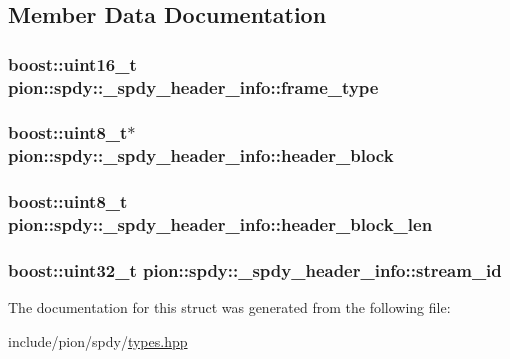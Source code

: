 \subsection{Member Data Documentation}
\hypertarget{structpion_1_1spdy_1_1__spdy__header__info_afa1a89722edd7a2eda6fd7a15abf7e76}{
\subsubsection[{frame\-\_\-type}]{\setlength{\rightskip}{0pt plus 5cm}boost\-::uint16\-\_\-t pion\-::spdy\-::\-\_\-spdy\-\_\-header\-\_\-info\-::frame\-\_\-type}}\label{structpion_1_1spdy_1_1__spdy__header__info_afa1a89722edd7a2eda6fd7a15abf7e76}
\hypertarget{structpion_1_1spdy_1_1__spdy__header__info_a04e2da993193a952036d13477114bd0e}{
\subsubsection[{header\-\_\-block}]{\setlength{\rightskip}{0pt plus 5cm}boost\-::uint8\-\_\-t$\ast$ pion\-::spdy\-::\-\_\-spdy\-\_\-header\-\_\-info\-::header\-\_\-block}}\label{structpion_1_1spdy_1_1__spdy__header__info_a04e2da993193a952036d13477114bd0e}
\hypertarget{structpion_1_1spdy_1_1__spdy__header__info_a0b5e5f60e357c45af5069d8c7e270028}{
\subsubsection[{header\-\_\-block\-\_\-len}]{\setlength{\rightskip}{0pt plus 5cm}boost\-::uint8\-\_\-t pion\-::spdy\-::\-\_\-spdy\-\_\-header\-\_\-info\-::header\-\_\-block\-\_\-len}}\label{structpion_1_1spdy_1_1__spdy__header__info_a0b5e5f60e357c45af5069d8c7e270028}
\hypertarget{structpion_1_1spdy_1_1__spdy__header__info_a34f64295be06d0aabaf70142f78e3050}{
\subsubsection[{stream\-\_\-id}]{\setlength{\rightskip}{0pt plus 5cm}boost\-::uint32\-\_\-t pion\-::spdy\-::\-\_\-spdy\-\_\-header\-\_\-info\-::stream\-\_\-id}}\label{structpion_1_1spdy_1_1__spdy__header__info_a34f64295be06d0aabaf70142f78e3050}


The documentation for this struct was generated from the following file\-:\begin{DoxyCompactItemize}
\item 
include/pion/spdy/\hyperlink{spdy_2types_8hpp}{types.\-hpp}\end{DoxyCompactItemize}
